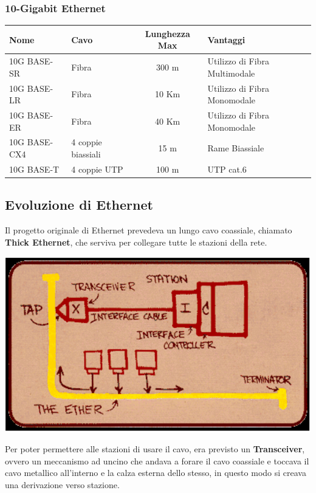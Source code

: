 \documentclass[12pt]{article}
\begin{document}
\subsubsection{10-Gigabit Ethernet}\label{ieee-802-livello-fisico-in-802.3-10gigabit-ethernet}
\begin{tabular}{ m{4cm} | m{3cm} | c | m{5cm}}
    \textbf{Nome} & \textbf{Cavo} & \textbf{Lunghezza Max} & \textbf{Vantaggi} \\[2pt]\hline
    10G BASE-SR & Fibra & 300 m & Utilizzo di Fibra Multimodale \\[2pt]\hline
    10G BASE-LR & Fibra & 10 Km & Utilizzo di Fibra Monomodale\\[2pt]\hline
    10G BASE-ER & Fibra & 40 Km & Utilizzo di Fibra Monomodale\\[2pt]\hline
    10G BASE-CX4 & 4 coppie biassiali & 15 m & Rame Biassiale \\[2pt]\hline
    10G BASE-T & 4 coppie UTP & 100 m & UTP cat.6 \\[2pt]\hline
\end{tabular}

\clearpage
\subsection{Evoluzione di Ethernet}\label{ieee-802-evoluzione-di-ethernet}
Il progetto originale di Ethernet prevedeva un lungo cavo coassiale, chiamato \textbf{Thick Ethernet}, che serviva per 
collegare tutte le stazioni della rete. 
\begin{center}
	\includegraphics[scale=0.5]{livello_collegamento-img10.png}
\end{center}
Per poter permettere alle stazioni di usare il cavo, era previsto un \textbf{Transceiver}, ovvero un meccanismo ad uncino che 
andava a forare il cavo coassiale e toccava il cavo metallico all'interno e la calza esterna dello stesso, in questo modo si 
creava una derivazione verso stazione.
\end{document}
